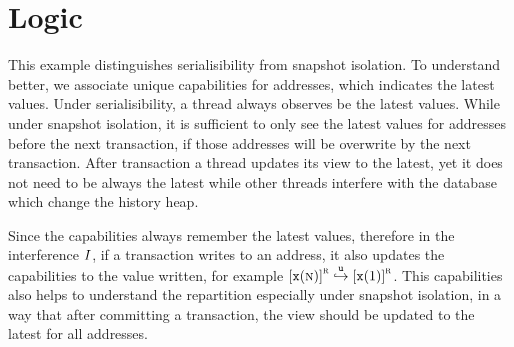 \section{Logic}



This example distinguishes serialisibility from snapshot isolation.
To understand better, we associate unique capabilities for addresses, which indicates the latest values.
Under serialisibility, a thread always observes be the latest values.
While under snapshot isolation, it is sufficient to only see the latest values for addresses before the next transaction, if those addresses will be overwrite by the next transaction.
After transaction a thread updates its view to the latest, yet it does not need to be always the latest while other threads interfere with the database which change the history heap.

Since the capabilities always remember the latest values, therefore in the interference \( I \), if a transaction writes to an address, it also updates the capabilities to the value written, for example \( \cass{\CB{x}(\V n)}{\lrid} \fpU \cass{\CB{x}(1)}{\lrid} \).
This capabilities also helps to understand the repartition especially under snapshot isolation, in a way that after committing a transaction, the view should be updated to the latest for all addresses.

